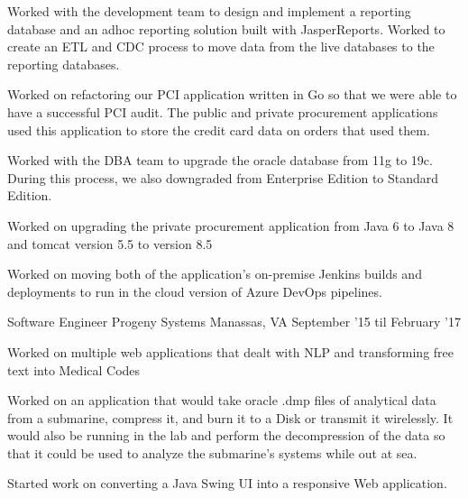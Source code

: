 \begin{cventries}
{\begin{cvitems}
        \item {Worked with the development team to design and implement a reporting database and an adhoc reporting solution built with JasperReports. Worked to create an ETL and CDC process to move data from the live databases to the reporting databases.}
        \item {Worked on refactoring our PCI application written in Go so that we were able to have a successful PCI audit. The public and private procurement applications used this application to store the credit card data on orders that used them.}
        \item {Worked with the DBA team to upgrade the oracle database from 11g to 19c. During this process, we also downgraded from Enterprise Edition to Standard Edition.}
        \item {Worked on upgrading the private procurement application from Java 6 to Java 8 and tomcat version 5.5 to version 8.5}
        \item {Worked on moving both of the application's on-premise Jenkins builds and deployments to run in the cloud version of Azure DevOps pipelines.}
        \end{cvitems}
    }

    \cventry
    {Software Engineer} %
    {Progeny Systems} %
    {Manassas, VA} %
    {September '15 til February '17} %
    {
        \begin{cvitems} %
        \item {Worked on multiple web applications that dealt with NLP and transforming free text into Medical Codes}
        \item {Worked on an application that would take oracle .dmp files of analytical data from a submarine, compress it, and burn it to a Disk or transmit it wirelessly. It would also be running in the lab and perform the decompression of the data so that it could be used to analyze the submarine's systems while out at sea.}
        \item {Started work on converting a Java Swing UI into a responsive Web application.}
        \end{cvitems}
    }
\end{cventries}
